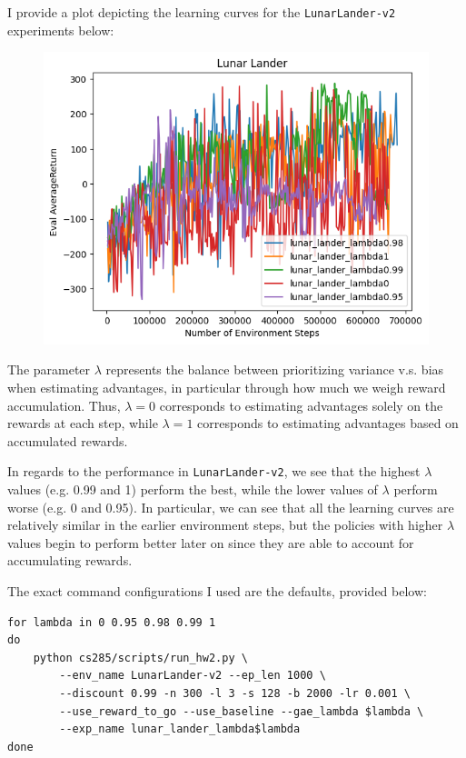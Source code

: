 \documentclass{article}
\begin{document}
\begin{sol}
    I provide a plot depicting the learning curves for the \texttt{LunarLander-v2} experiments below:
    \begin{figure}[h!]
        \begin{center}
        \includegraphics[width=\textwidth*2/3]{q5_lunar_avg_returns.png}
        \end{center}
    \end{figure}

The parameter $\lambda$ represents the balance between prioritizing variance v.s. bias when estimating advantages, in particular through how much we weigh reward accumulation. Thus, $\lambda=0$ corresponds to estimating advantages solely on the rewards at each step, while $\lambda=1$ corresponds to estimating advantages based on accumulated rewards.

In regards to the performance in \texttt{LunarLander-v2}, we see that the highest $\lambda$ values (e.g. 0.99 and 1) perform the best, while the lower values of $\lambda$ perform worse (e.g. 0 and 0.95). In particular, we can see that all the learning curves are relatively similar in the earlier environment steps, but the policies with higher $\lambda$ values begin to perform better later on since they are able to account for accumulating rewards.

The exact command configurations I used are the defaults, provided below:
\begin{lstlisting}
for lambda in 0 0.95 0.98 0.99 1
do
    python cs285/scripts/run_hw2.py \
        --env_name LunarLander-v2 --ep_len 1000 \
        --discount 0.99 -n 300 -l 3 -s 128 -b 2000 -lr 0.001 \
        --use_reward_to_go --use_baseline --gae_lambda $lambda \
        --exp_name lunar_lander_lambda$lambda
done
\end{lstlisting}
\end{sol}
\end{document}

